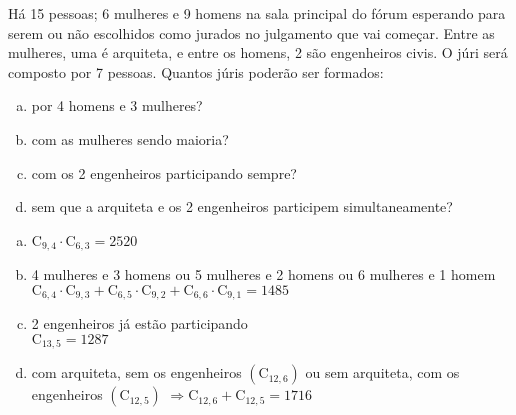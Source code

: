 \begin{ex}
 Há 15 pessoas; 6 mulheres e 9 homens na sala principal do fórum esperando para serem ou não escolhidos como jurados no julgamento que vai começar. Entre as mulheres, uma é arquiteta, e entre os homens, 2 são engenheiros civis. O júri será composto por 7 pessoas. Quantos júris poderão ser formados:
    \begin{enumerate}[(a)]
    \item por 4 homens e 3 mulheres?
    \item com as mulheres sendo maioria?
    \item com os 2 engenheiros participando sempre?
    \item sem que a arquiteta e os 2 engenheiros participem simultaneamente?
    \end{enumerate}
     \begin{sol}
      \phantom{A}  
        \begin{enumerate} [(a)]
         \item $\mathrm{C}_{9,4}\cdot\mathrm{C}_{6,3}=2520$
         \item 4 mulheres e 3 homens ou 5 mulheres  e 2 homens ou 6 mulheres e 1 homem \\
         $\mathrm{C}_{6,4}\cdot\mathrm{C}_{9,3}+\mathrm{C}_{6,5}\cdot\mathrm{C}_{9,2}+\mathrm{C}_{6,6}\cdot\mathrm{C}_{9,1}=1485$
        \item 2 engenheiros já estão participando \\ $\mathrm{C}_{{13},5}=1287$
        \item com arquiteta, sem os engenheiros $(\mathrm{C}_{{12},6})$ ou sem arquiteta, com os engenheiros $(\mathrm{C}_{{12},5})$ 
        $\Longrightarrow \mathrm{C}_{{12},6}+\mathrm{C}_{{12},5}=1716$
        \end{enumerate}
       \end{sol}
  \end{ex}